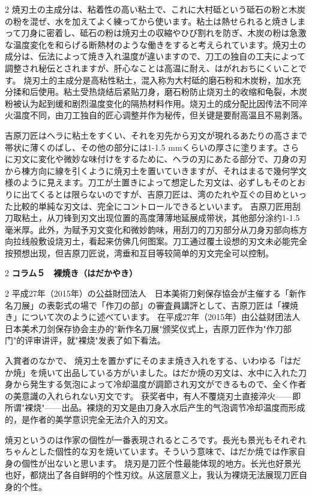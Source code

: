 \documentclass[12pt,UTF8]{ctexbook}
\begin{document}
\begin{paracol}{2}
焼刃土の主成分は、粘着性の高い粘土で、これに大村砥という砥石の粉と木炭の粉を混ぜ、水を加えてよく練ってから使います。粘土は熱せられると焼きしまって刀身に密着し、砥石の粉は焼刃土の収縮やひび割れを防ぎ、木炭の粉は急激な温度変化を和らげる断熱材のような働きをすると考えられています。焼刃土の成分は、伝法によって焼き入れ温度が違いますので、刀工の独自の工夫によって調整され秘伝とされますが、肝心なことは高温に耐え、はがれおちにくいことです。
\switchcolumn*
烧刃土的主成分是高粘性粘土，混入称为大村砥的磨石粉和木炭粉，加水充分揉和后使用。粘土受热烧结后紧贴刀身，磨石粉防止烧刃土的收缩和龟裂，木炭粉被认为起到缓和剧烈温度变化的隔热材料作用。烧刃土的成分配比因传法不同淬火温度不同，由刀工独自的匠心调整并作为秘传，但关键是要耐高温且不易剥落。
\switchcolumn*

吉原刀匠はヘラに粘土をすくい、それを刃先から刃文が現れるあたりの高さまで帯状に薄くのばし、その他の部分には1-1.5 mmくらいの厚さに塗ります。さらに刃文に変化や微妙な味付けをするために、ヘラの刃にあたる部分で、刀身の刃から棟方向に線を引くように焼刃土を置いていきますが、それはまるで幾何学文様のように見えます。刀工が土置きによって想定した刃文は、必ずしもそのとおりに出てくるとは限らないのですが、吉原刀匠は、湾のたれや互ぐの目めといった比較的単純な刃文は、完全にコントロールできるといいます。
\switchcolumn*
吉原刀匠用刮刀取粘土，从刀锋到刃文出现位置的高度薄薄地延展成带状，其他部分涂约1-1.5毫米厚。此外，为赋予刃文变化和微妙韵味，用刮刀的刀刃部分从刀身刃部向栋方向拉线般敷设烧刃土，看起来仿佛几何图案。刀工通过覆土设想的刃文未必能完全按预想出现，但吉原刀匠说，湾垂和互目等较简单的刃文完全可以控制。
\end{paracol}

\begin{paracol}{2}
{\bfseries コラム５　裸焼き（はだかやき）}
\end{paracol}

\vspace{0.2em}

\begin{paracol}{2}
平成27年（2015年）の公益財団法人　日本美術刀剣保存協会が主催する「新作名刀展」の表彰式の場で「作刀の部」の審査員講評として、吉原刀匠は「裸焼き」について次のように述べています。
\switchcolumn*
在平成27年（2015年）由公益财团法人日本美术刀剑保存协会主办的"新作名刀展"颁奖仪式上，吉原刀匠作为"作刀部门"的评审讲评，就"裸烧"发表了如下看法。
\switchcolumn*

入賞者のなかで、 焼刃土を置かずにそのまま焼き入れをする、いわゆる「はだか焼」を焼いて出品している方がいました。はだか焼の刃文は、水中に入れた刀身から発生する気泡によって冷却温度が調節され刃文ができるもので、全く作者の美意識の入れられない刃文です。
\switchcolumn*
获奖者中，有人不覆烧刃土直接淬火——即所谓"裸烧"——出品。裸烧的刃文是由刀身入水后产生的气泡调节冷却温度而形成的，是作者的美学意识完全无法介入的刃文。
\switchcolumn*

焼刃というのは作家の個性が一番表現されるところです。長光も景光もそれぞれちゃんとした個性的な刃を焼いています。そういう意味で、はだか焼では作家自身の個性が出ないと思います。
\switchcolumn*
烧刃是刀匠个性最能体现的地方。长光也好景光也好，都烧出了各自鲜明的个性刃纹。从这层意义上，我认为裸烧无法展现刀匠自身的个性。
\end{paracol}
\end{document}
